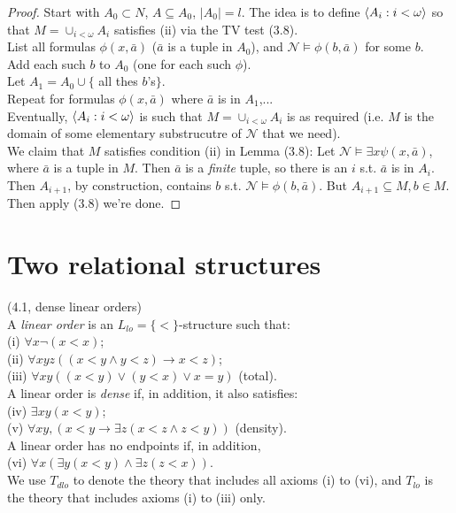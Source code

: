 \documentclass[a4paper]{article}
\begin{document}
\begin{thm}
\begin{proof}
        Start with $A_0 \subset N$, $A \subseteq A_0$, $|A_0| = l$. The idea is to define $\langle A_i: i <\omega \rangle$ so that $M = \cup_{i < \omega}A_i$ satisfies (ii) via the TV test (3.8).\\
        List all formulas $\phi(x,\bar{a})$ ($\bar{a}$ is a tuple in $A_0$), and $\mathcal{N} \vDash \phi(b,\bar{a})$ for some $b$.\\
        Add each such $b$ to $A_0$ (one for each such $\phi$).\\
        Let $A_1 =A_0 \cup \{$ all thes $b$'s$\}$.\\
        Repeat for formulas $\phi(x,\bar{a})$ where $\bar{a}$ is in $A_1$,...\\
        Eventually, $\langle A_i: i<\omega\rangle$ is such that $M = \cup_{i < \omega} A_i$ is as required (i.e. $M$ is the domain of some elementary substrucutre of $\mathcal{N}$ that we need).\\
        We claim that $M$ satisfies condition (ii) in Lemma (3.8): Let $\mathcal{N} \vDash \exists x \psi(x,\bar{a})$, where $\bar{a}$ is a tuple in $M$. Then $\bar{a}$ is a \emph{finite} tuple, so there is an $i$ s.t. $\bar{a}$ is in $A_i$.\\
        Then $A_{i+1}$, by construction, contains $b$ s.t. $\mathcal{N} \vDash \phi(b,\bar{a})$. But $A_{i+1} \subseteq M, b \in M$.\\
        Then apply (3.8) we're done.
    \end{proof}
\end{thm}

\newpage

\section{Two relational structures}

\begin{defi} (4.1, dense linear orders)\\
    A \emph{linear order} is an $L_{lo} = \{<\}$-structure such that:\\
    (i) $\forall x \neg (x<x)$;\\
    (ii) $\forall xyz ((x<y \wedge y<z) \to x<z)$;\\
    (iii) $\forall xy((x<y) \vee (y<x) \vee x=y)$ (total).\\
    A linear order is \emph{dense} if, in addition, it also satisfies:\\
    (iv) $\exists xy (x<y)$;\\
    (v) $\forall xy, (x<y \to \exists z (x<z \wedge z<y))$ (density).\\
    A linear order has no endpoints if, in addition, \\
    (vi) $\forall x (\exists y(x<y) \wedge \exists z(z<x))$.\\
    We use $T_{dlo}$ to denote the theory that includes all axioms (i) to (vi), and $T_{lo}$ is the theory that includes axioms (i) to (iii) only.
\end{defi}
\end{document}
